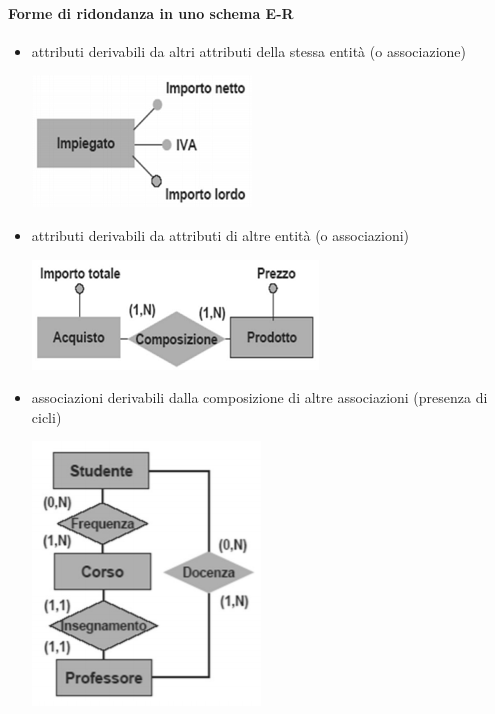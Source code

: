 \paragraph{Forme di ridondanza in uno schema E-R} 
\begin{itemize}
	\item attributi derivabili da altri attributi della stessa entità (o associazione)
	\begin{center}
		\includegraphics{images/109.PNG}
	\end{center}
	\item attributi derivabili da attributi di altre entità (o associazioni)
	\begin{center}
		\includegraphics{images/110.PNG}
	\end{center}
	\item associazioni derivabili dalla composizione di altre associazioni (presenza di cicli)
	\begin{center}
		\includegraphics{images/111.PNG}
	\end{center}
\end{itemize}

